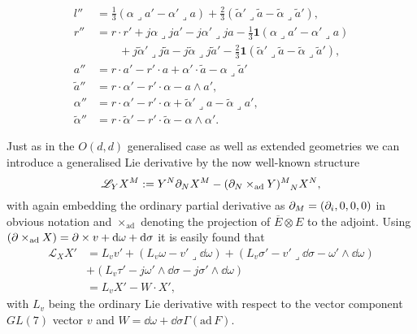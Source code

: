 \begin{equation}\label{eq:E7AdjointAction}
    \begin{aligned}
        l'' &= \frac{1}{3}(\alpha\lrcorner a'-\alpha'\lrcorner a)+\frac{2}{3}(\tilde{\alpha}'\lrcorner\tilde{a}-\tilde{\alpha}\lrcorner\tilde{a}'),\\
        r'' &= r\cdot r'+j\alpha\lrcorner ja'-j\alpha'\lrcorner ja-\frac{1}{3}\mathbf{1}(\alpha\lrcorner a'-\alpha'\lrcorner a)\\
        &\qquad+j\tilde{\alpha}'\lrcorner j\tilde{a}-j\tilde{\alpha}\lrcorner j\tilde{a}'-\frac{2}{3}\mathbf{1}(\tilde{\alpha}'\lrcorner \tilde{a}-\tilde{\alpha}\lrcorner \tilde{a}'),\\
        a'' &= r\cdot a'-r'\cdot a+\alpha'\cdot\tilde{a}-\alpha\lrcorner \tilde{a}'\\
        \tilde{a}'' &= r\cdot\alpha'-r'\cdot\alpha-a\wedge a',\\
        \alpha'' &= r\cdot\alpha'-r'\cdot\alpha+\tilde{\alpha}'\lrcorner a-\tilde{\alpha}\lrcorner a',\\
        \tilde{\alpha}'' &= r\cdot\tilde{\alpha}'-r'\cdot\tilde{\alpha}-\alpha\wedge\alpha'.
    \end{aligned}
\end{equation}

Just as in the $O(d,d)$ generalised case as well as extended geometries we can introduce a generalised Lie derivative by the now well-known structure
\begin{equation}
    \mathscr{L}_Y X^M := Y^N\pd_NX^M-(\pd_N\times_{\text{ad}}Y)\tensor{}{^M_N}X^N,
\end{equation}
with again embedding the ordinary partial derivative as $\partial_M=(\partial_i,0,0,0)$ in obvious notation and $\times_{\text{ad}}$ denoting the projection of $\overbar{E}\otimes E$ to the adjoint. Using $(\partial\times_{\text{ad}}X)=\partial\times v+\mathrm{d}\omega+\mathrm{d}\sigma$ it is easily found that 
\begin{equation}\label{eq:GengeometryLieDerivate}
    \begin{aligned}
        \mathscr{L}_X X' &= L_vv'+(L_v\omega-v'\lrcorner\dd\omega)+(L_v\sigma'-v'\lrcorner\dd\sigma-\omega'\wedge\dd\omega)\\
        &+(L_v\tau'-j\omega'\wedge\dd\sigma-j\sigma'\wedge\dd\omega)\\
        &= L_v X'-W\cdot X',
    \end{aligned}
\end{equation}
with $L_v$ being the ordinary Lie derivative with respect to the vector component $GL(7)$ vector $v$ and $W=\dd\omega+\dd\sigma \Gamma(\text{ad}\,F)$. 


